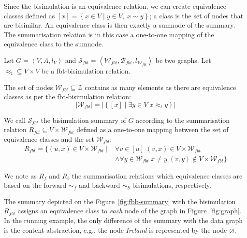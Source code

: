 Since the bisimulation is an equivalence relation, we can create equivalence classes defined as $[x] = \left\lbrace x \in V \mid y \in V,\; x \sim y \right\rbrace$; a class is the set of nodes that are bisimilar. An equivalence class is then exactly a sumnode of the summary. The summarisation relation is in this case a one-to-one mapping of the equivalence class to the sumnode.

\begin{definition}
Let $G=\left\langle V, A, l_V \right\rangle$ and $\mathcal{S}_{fbt} = \left\langle \mathcal{W}_{fbt}, \mathcal{B}_{fbt}, l_{\mathcal{W}_{fbt}} \right\rangle$ be two graphs. Let $\approx_t \subseteq V \times V$ be a fbt-bisimulation relation.

The set of nodes $\mathcal{W}_{fbt} \subseteq \mathcal{Z}$ contains as many elements as there are equivalence classes as per the fbt-bisimulation relation:
$$
\lvert \mathcal{W}_{fbt} \rvert = \lvert \left\lbrace [x] \mid \exists y \in V\; x \approx_t y \right\rbrace \rvert
$$

We call $\mathcal{S}_{fbt}$ the bisimulation summary of $G$ according to the summarisation relation $R_{fbt} \subseteq V \times \mathcal{W}_{fbt}$ defined as a one-to-one mapping between the set of equivalence classes and the set $\mathcal{W}_{fbt}$:
$$
\begin{aligned}
R_{fbt} = \{ \left( u, x \right) \in V \times \mathcal{W}_{fbt} \mid & \forall v \in [u]\; \left( v, x \right) \in V \times \mathcal{W}_{fbt} \\
& \wedge \forall y \in \mathcal{W}_{fbt}\; x \neq y\; (v, y) \not \in V \times \mathcal{W}_{fbt} \}
\end{aligned}
$$
\end{definition}

\begin{remark}
We note as $R_f$ and $R_b$ the summarisation relations which equivalence classes are based on the forward $\sim_f$ and backward $\sim_b$ bisimulations, respectively.
\end{remark}

The summary depicted on the Figure~\ref{fig:fbb-summary} with the bisimulation $R_{fbt}$ assigns an equivalence class to \emph{each} node of the graph in Figure~\ref{fig:graph}. In the running example, the only difference of the summary with the data graph is the content abstraction, e.g., the node \emph{Ireland} is represented by the node $\varnothing$.

